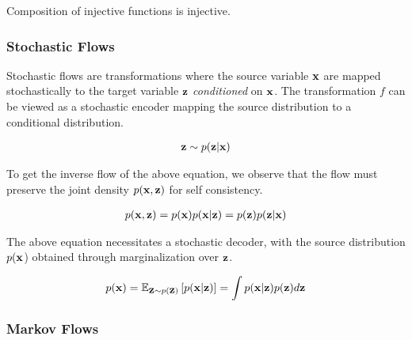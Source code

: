 \documentclass[a4paper, 11pt]{article}
\begin{document}
Composition of injective functions is injective.


\subsubsection{Stochastic Flows}
Stochastic flows are transformations where the source variable $\vx$ are mapped stochastically to the target variable $\vz$ \emph{conditioned} on $\vx$. The transformation $f$ can be viewed as a stochastic encoder mapping the source distribution to a conditional distribution.

\begin{align}
    \vz \sim p(\vz | \vx)
\end{align}

To get the inverse flow of the above equation, we observe that the flow must preserve the joint density $p(\vx, \vz)$ for self consistency.

\begin{align}
    p(\vx, \vz) = p(\vx)p(\vx | \vz) = p(\vz)p(\vz|\vx)
\end{align}

The above equation necessitates a stochastic decoder, with the source distribution $p(\vx$) obtained through marginalization over $\vz$.

\begin{align} \label{eq:sto_marg}
    p(\vx)= \E_{\vz \sim p(\vz) } \left [ p(\vx | \vz) \right ] = \int p(\vx | \vz) p(\vz) d\vz
\end{align}

\subsubsection{Markov Flows}
\end{document}
